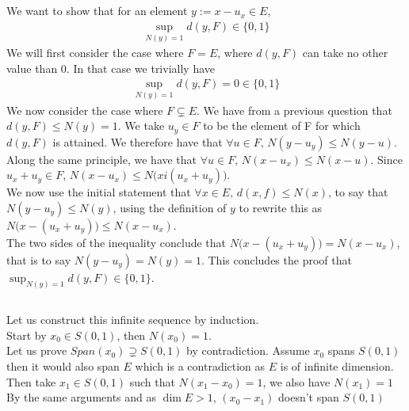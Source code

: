 \documentclass{article}
\begin{document}
\subsection{} %
We want to show that for an element $y:=x-u_x \in E$, 
\begin{align*}
	\sup _{N(y) = 1} d(y,F) \in \{ 0,1\}
\end{align*}
We will first consider the case where $F = E$, where $d(y,F)$ can take no other value than 0. In that case we trivially have
\begin{align*}
	\sup _{N(y) = 1} d(y,F) = 0 \in \{ 0,1\}
\end{align*}
We now consider the case where $F \subsetneq E$. We have from a previous question that $d(y,F) \leq N(y) = 1$. We take $u_y \in F$ to be the element of F for which $d(y,F)$ is attained. We therefore have that $\forall u \in F, \, N(y - u_y) \leq N(y - u)$. Along the same principle, we have that $\forall u \in F, \, N(x - u_x) \leq N(x - u)$. Since $u_x + u_y \in F$, $N(x - u_x) \leq N\big( x i (u_x + u_y)\big)$.\\
\noindent We now use the initial statement that $\forall x \in E, \, d(x,f) \leq N(x)$, to say that $N(y- u_y) \leq N(y)$, using the definition of $y$ to rewrite this as $N\big( x - (u_x + u_y)\big) \leq N(x - u_x)$.\\
\noindent The two sides of the inequality conclude that $N\big( x - (u_x + u_y)\big) = N(x - u_x)$, that is to say $N(y- u_y) = N(y) = 1$. This concludes the proof that $\sup _{N(y) = 1} d(y,F) \in \{ 0,1\}$.

\subsection{} %

Let us construct this infinite sequence by induction. \\

\noindent Start by $x_0 \in S(0,1)$, then $N(x_0)=1$. \\
Let us prove $Span(x_0) \supsetneq S(0,1)$ by contradiction. Assume $x_0$ spans $S(0,1)$ then it would also span $E$ which is a contradiction as $E$ is of infinite dimension. \\

\noindent Then take $x_1 \in S(0,1)$ such that $N(x_1-x_0)=1$, we also have $N(x_1)=1$ \\
By the same arguments and as $\dim E > 1$, $(x_0 - x_1)$ doesn't span $S(0,1)$ \\
\end{document}
